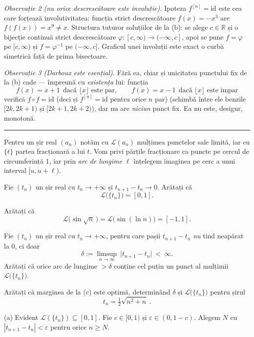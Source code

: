 \emph{Observație 2 (nu orice descrescătoare este involuție).} Ipoteza $f^{[n]}=\mathrm{id}$ este cea care forțează involutivitatea: funcția strict descrescătoare $f(x)=-x^{3}$ are $f(f(x))=x^{9}\neq x$. Structura tuturor soluțiilor de la (b): se alege $c\in\mathbb{R}$ și o bijecție continuă strict descrescătoare $\varphi:[c,\infty)\to(-\infty,c]$, apoi se pune $f=\varphi$ pe $[c,\infty)$ și $f=\varphi^{-1}$ pe $(-\infty,c]$. Graficul unei involuții este exact o curbă simetrică față de prima bisectoare.

\emph{Observație 3 (Darboux este esențial).} Fără ea, chiar și unicitatea punctului fix de la (b) cade --- împreună cu \emph{existența} lui: funcția
\[ f(x)=x+1\ \ \text{dacă }\lfloor x\rfloor\text{ este par},\qquad f(x)=x-1\ \ \text{dacă }\lfloor x\rfloor\text{ este impar} \]
verifică $f\circ f=\mathrm{id}$ (deci și $f^{[n]}=\mathrm{id}$ pentru orice $n$ par) (schimbă între ele benzile $[2k,2k+1)$ și $[2k+1,2k+2)$), dar nu are \emph{niciun} punct fix. Ea nu este, desigur, monotonă.
\vspace{1mm}\hrule

Pentru un șir real $(a_n)$ notăm cu $\mathcal{L}(a_n)$ mulțimea punctelor sale limită, iar cu $\{t\}$ partea fracționară a lui $t$. Vom privi părțile fracționare ca puncte pe cercul de circumferință $1$, iar prin \emph{arc de lungime $\ell$} înțelegem imaginea pe cerc a unui interval $[u,u+\ell)$.
\begin{parti}
  \item Fie $(t_n)$ un șir real cu $t_n\to+\infty$ și $t_{n+1}-t_n\to0$. Arătați că
  \[ \mathcal{L}\bigl(\{t_n\}\bigr)=[0,1] . \]
  \item Arătați că
  \[ \mathcal{L}\bigl(\sin\sqrt n\,\bigr)=\mathcal{L}\bigl(\sin(\ln n)\bigr)=[-1,1] . \]
  \item Fie $(t_n)$ un șir real cu $t_n\to+\infty$, pentru care pașii $t_{n+1}-t_n$ \emph{nu} tind neapărat la $0$, ci doar
  \[ \delta:=\limsup_{n\to\infty}\ \bigl|t_{n+1}-t_n\bigr|\ <\ \infty . \]
  Arătați că orice arc de lungime $>\delta$ conține cel puțin un punct al mulțimii $\mathcal{L}\bigl(\{t_n\}\bigr)$.
  \item Arătați că marginea de la (c) este optimă, determinând $\delta$ și $\mathcal{L}\bigl(\{t_n\}\bigr)$ pentru șirul
  \[ t_n=\tfrac12\sqrt{n^{2}+n}\ . \]
\end{parti}
\sol (a) Evident $\mathcal{L}(\{t_n\})\subseteq[0,1]$. Fie $c\in[0,1)$ și $\varepsilon\in(0,1-c)$. Alegem $N$ cu $|t_{n+1}-t_n|<\varepsilon$ pentru orice $n\ge N$.

